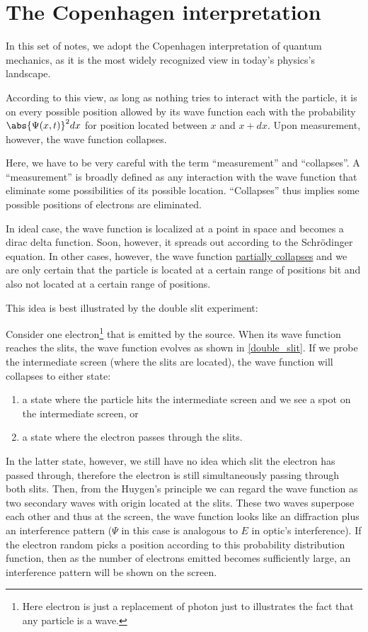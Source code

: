 \documentclass[a4paper,12pt]{report}
\begin{document}
\section{The Copenhagen interpretation}
	
In this set of notes, we adopt the Copenhagen interpretation of quantum mechanics, as it is the most widely recognized view in today's physics's landscape. 

According to this view, as long as nothing tries to interact with the particle, it is on every possible position allowed by its wave function each with the probability \(\abs{\Psi(x,t)}^2 dx\) for position located between \(x\) and \(x + dx\). Upon measurement, however, the wave function collapses.

Here, we have to be very careful with the term ``measurement'' and ``collapses''. A ``measurement'' is broadly defined as any interaction with the wave function that eliminate some possibilities of its possible location. ``Collapses'' thus implies some possible positions of electrons are eliminated.

In ideal case, the wave function is localized at a point in space and becomes a dirac delta function. Soon, however, it spreads out according to the Schrödinger equation. In other cases, however, the wave function \href{https://arxiv.org/pdf/2106.00466}{partially collapses} and we are only certain that the particle is located at a certain range of positions bit and also not located at a certain range of positions.

This idea is best illustrated by the double slit experiment: 

Consider one electron\footnote{Here electron is just a replacement of photon just to illustrates the fact that any particle is a wave.} that is emitted by the source. When its wave function reaches the slits, the wave function evolves as shown in \cref{double_slit}. If we probe the intermediate screen (where the slits are located), the wave function will collapses to either state: 

\begin{enumerate}
  \item a state where the particle hits the intermediate screen and we see a spot on the intermediate screen, or
  \item a state where the electron passes through the slits.
\end{enumerate}

In the latter state, however, we still have no idea which slit the electron has passed through, therefore the electron is still simultaneously passing through both slits. Then, from the Huygen's principle we can regard the wave function as two secondary waves with origin located at the slits. These two waves superpose each other and thus at the screen, the wave function looks like an diffraction plus an interference pattern (\(\Psi\) in this case is analogous to \(E\) in optic's interference). If the electron random picks a position according to this probability distribution function, then as the number of electrons emitted becomes sufficiently large, an interference pattern will be shown on the screen.
\end{document}
